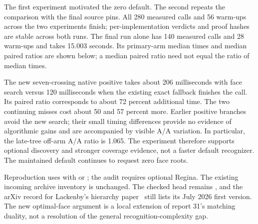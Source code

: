 The first experiment motivated the zero default. The second repeats the
comparison with the final source pins. All 280 measured calls and 56
warm-ups across the two experiments finish; per-implementation verdicts
and proof hashes are stable across both runs. The final run alone has
140 measured calls and 28 warm-ups and takes 15.003 seconds. Its primary-arm
median times and median paired ratios are shown below; a median paired
ratio need not equal the ratio of median times.

\begin{center}
\small
\end{center}

The new seven-crossing native positive takes about 206 milliseconds with
face search versus 120 milliseconds when the existing exact fallback
finishes the call. Its paired ratio corresponds to about 72 percent
additional time. The two continuing misses cost about 50 and 57 percent
more. Earlier positive branches avoid the new search; their small timing
differences provide no evidence of algorithmic gains and are accompanied
by visible A/A variation. In particular, the late-tree off-arm A/A ratio
is 1.065. The experiment therefore supports optional discovery and stronger
coverage evidence, not a faster default recognizer. The maintained default
continues to request zero face roots.

Reproduction uses  with
 or ; the audit requires optional Regina.
The existing incoming archive inventory is unchanged. The checked
 head remains , and the arXiv record for
Lackenby's hierarchy paper~\cite{lackenby2026} still lists its July 2026 first version. The
new optimal-face argument is a local extension of report 31's matching
duality, not a resolution of the general recognition-complexity gap.
